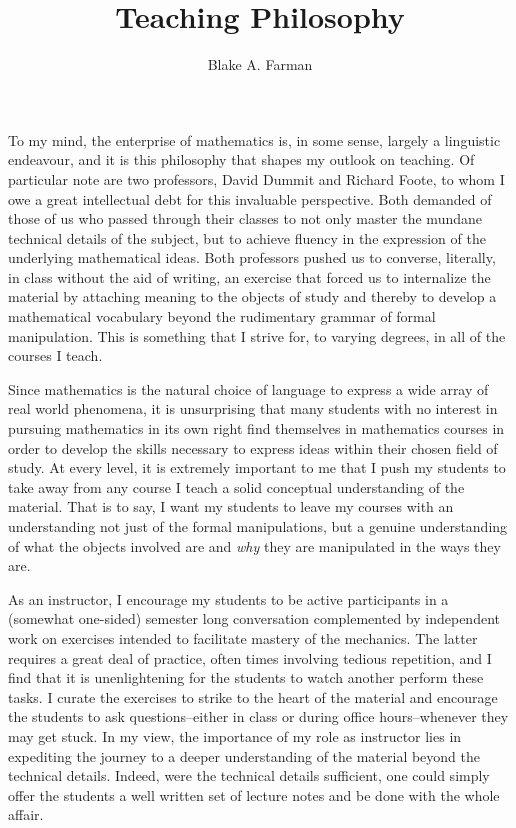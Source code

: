 \documentclass[11pt]{amsart}
\title{Teaching Philosophy}
\author{Blake A. Farman}
\date{}
\begin{document}
\maketitle

To my mind, the enterprise of mathematics is, in some sense, largely a linguistic endeavour, and it is this philosophy that shapes my outlook on teaching.
Of particular note are two professors, David Dummit and Richard Foote, to whom I owe a great intellectual debt for this invaluable perspective.
Both demanded of those of us who passed through their classes to not only master the mundane technical details of the subject, but to achieve fluency in the expression of the underlying mathematical ideas.
Both professors pushed us to converse, literally, in class without the aid of writing, an exercise that forced us to internalize the material by attaching meaning to the objects of study and thereby to develop a mathematical vocabulary beyond the rudimentary grammar of formal manipulation.
This is something that I strive for, to varying degrees, in all of the courses I teach.

Since mathematics is the natural choice of language to express a wide array of real world phenomena, it is unsurprising that many students with no interest in pursuing mathematics in its own right find themselves in mathematics courses in order to develop the skills necessary to express ideas within their chosen field of study.
At every level, it is extremely important to me that I push my students to take away from any course I teach a solid conceptual understanding of the material.
That is to say, I want my students to leave my courses with an understanding not just of the formal manipulations, but a genuine understanding of what the objects involved are and \textit{why} they are manipulated in the ways they are.

As an instructor, I encourage my students to be active participants in a (somewhat one-sided) semester long conversation complemented by independent work on exercises intended to facilitate mastery of the mechanics.
The latter requires a great deal of practice, often times involving tedious repetition, and I find that it is unenlightening for the students to watch another perform these tasks.
I curate the exercises to strike to the heart of the material and encourage the students to ask questions--either in class or during office hours--whenever they may get stuck.
In my view, the importance of my role as instructor lies in expediting the journey to a deeper understanding of the material beyond the technical details.
Indeed, were the technical details sufficient, one could simply offer the students a well written set of lecture notes and be done with the whole affair.
\end{document}
